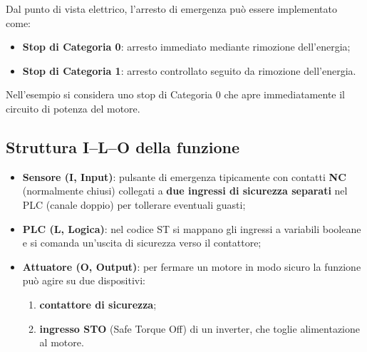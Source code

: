 Dal punto di vista elettrico, l'arresto di emergenza può essere implementato come:
\begin{itemize}
    \item \textbf{Stop di Categoria 0}: arresto immediato mediante rimozione dell'energia;
    \item \textbf{Stop di Categoria 1}: arresto controllato seguito da rimozione dell'energia.
\end{itemize}
Nell'esempio si considera uno stop di Categoria 0 che apre immediatamente il circuito di potenza del motore.

\subsection{Struttura I--L--O della funzione}
\begin{itemize}
    \item \textbf{Sensore (I, Input)}: pulsante di emergenza tipicamente con contatti \textbf{NC} (normalmente chiusi) collegati a \textbf{due ingressi di sicurezza separati} nel PLC (canale doppio) per tollerare eventuali guasti;
    \item \textbf{PLC (L, Logica)}: nel codice ST si mappano gli ingressi a variabili booleane e si comanda un'uscita di sicurezza verso il contattore;
    \item \textbf{Attuatore (O, Output)}: per fermare un motore in modo sicuro la funzione può agire su due dispositivi:
    \begin{enumerate}
        \item \textbf{contattore di sicurezza};
        \item \textbf{ingresso STO} (Safe Torque Off) di un inverter, che toglie alimentazione al motore.
    \end{enumerate}
\end{itemize}

